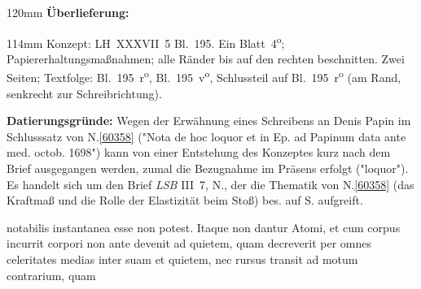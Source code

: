 \begin{ledgroupsized}[r]{120mm}
\footnotesize
\pstart
\noindent\textbf{Überlieferung:}
\pend
\end{ledgroupsized}
\begin{ledgroupsized}[r]{114mm}
\footnotesize
\pstart \parindent -6mm
%
Konzept:
LH~XXXVII~5 Bl.~195. 
Ein Blatt~4\textsuperscript{o};
Papiererhaltungsmaßnahmen;
alle Ränder bis auf den rechten beschnitten.
Zwei Seiten; Textfolge: Bl.~195~r\textsuperscript{o}, Bl.~195~v\textsuperscript{o}, Schlussteil auf Bl.~195~r\textsuperscript{o} (am Rand, senkrecht zur Schreibrichtung). 
\pend
\end{ledgroupsized}
\vspace{5mm}
\begin{ledgroup}
\footnotesize
\pstart
\noindent%
\textbf{Datierungsgründe:}
Wegen der Erwähnung eines Schreibens an 
Denis Papin 
im Schlusssatz von N.\;\ref{60358}
("Nota de hoc loquor et in Ep. ad Papinum data ante med. octob. 1698")
kann von einer Entstehung des Konzeptes kurz nach dem Brief ausgegangen werden,
zumal die Bezugnahme im Präsens erfolgt ("loquor").
Es handelt sich um den Brief \cite{01501}\textit{LSB} III~7, N., 
der die Thematik von N.\;\ref{60358} (das Kraftmaß und die Rolle der Elastizität beim Stoß)
bes. auf S. aufgreift.
\pend
\end{ledgroup}
\vspace{8mm}
\pstart%
\noindent%
%
%
notabilis instantanea esse non potest. Itaque non dantur Atomi, et 
cum corpus incurrit corpori non ante devenit ad quietem, quam decreverit per omnes celeritates 
medias inter suam et quietem, nec rursus transit ad motum contrarium, quam 
